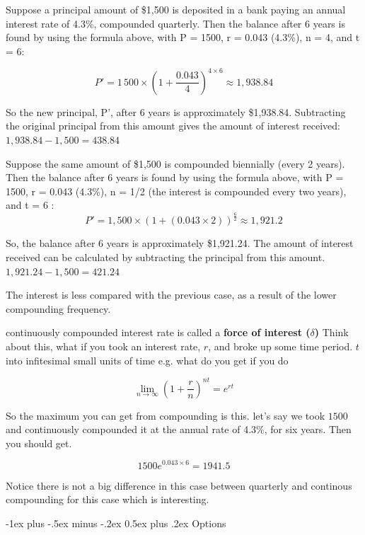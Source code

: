 \documentclass[10pt,landscape]{article}
\makeatletter
\renewcommand{\section}{\@startsection{section}{1}{0mm}%
                                {-1ex plus -.5ex minus -.2ex}%
                                {0.5ex plus .2ex}%
                                {\normalfont\large\bfseries}}
\makeatother
\begin{document}
\begin{multicols}{3}
Suppose a principal amount of \$1,500 is deposited in a bank paying an annual interest rate of 4.3\%, compounded quarterly.
Then the balance after 6 years is found by using the formula above, with P = 1500, r = 0.043 (4.3\%), n = 4, and t = 6: 

$$ P'=1\,500\times \left(1+{\frac {0.043}{4}}\right)^{4\times 6}\approx 1,938.84$$ 

So the new principal, P', after 6 years is approximately \$1,938.84. 
Subtracting the original principal from this amount gives the amount of interest received: 
$1,938.84-1,500=438.84$

\vspace{0.25cm}


Suppose the same amount of \$1,500 is compounded biennially (every 2 years).
Then the balance after 6 years is found by using the formula above, with P = 1500, r = 0.043 (4.3\%), n = 1/2 (the interest is compounded every two years), and t = 6 : 
$$P'=1,500\times \left(1+(0.043\times 2)\right)^{\frac {6}{2}}\approx 1,921.2$$ 

So, the balance after 6 years is approximately \$1,921.24. 
The amount of interest received can be calculated by subtracting the principal from this amount. 
$1,921.24-1,500=421.24$

The interest is less compared with the previous case, as a result of the lower compounding frequency.

\vspace{0.25cm} 

continuously compounded interest rate is called a \textbf{force of interest ($\delta$)} Think about this, what if you took an interest rate, $r$, and broke up some time period. $t$ into infitesimal small units of time e.g. what do you get if you do

$$ \lim\limits_{n\to\infty} (1+\frac{r}{n})^{n t}  = e^{rt}$$

\vspace{0.25cm}  

So the maximum you can get from compounding is this. let's say we took $1500$ and continuously compounded it at the annual rate of 4.3\%, for six years. Then you should get.

$$ 1500 e^{0.043\times6} = 1941.5$$

Notice there is not a big difference in this case between quarterly and continous compounding for this case which is interesting.


\section{Options}


\end{multicols}
\end{document}
